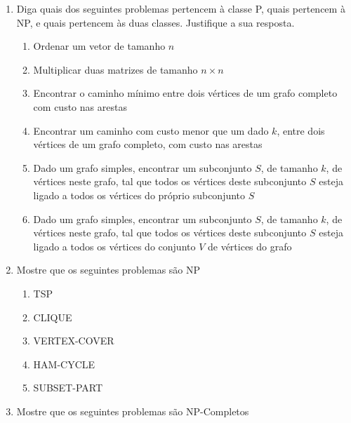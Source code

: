 \documentclass[12pt]{article}
\begin{document}
\begin{enumerate}

\item Diga quais dos seguintes problemas pertencem à classe P, quais pertencem à NP, e quais pertencem às duas classes. Justifique a sua resposta.

\begin{enumerate}

\item Ordenar um vetor de tamanho $n$

\item Multiplicar duas matrizes de tamanho $n\times n$

\item Encontrar o caminho mínimo entre dois vértices de um grafo completo com custo nas arestas

\item Encontrar um caminho com custo menor que um dado $k$, entre dois vértices de um grafo completo, com custo nas arestas

\item Dado um grafo simples, encontrar um subconjunto $S$, de tamanho $k$, de vértices neste grafo, tal que todos os vértices deste subconjunto $S$ esteja ligado a todos os vértices do próprio subconjunto $S$

\item Dado um grafo simples, encontrar um subconjunto $S$, de tamanho $k$, de vértices neste grafo, tal que todos os vértices deste subconjunto $S$ esteja ligado a todos os vértices do conjunto $V$ de vértices do grafo

\end{enumerate}


\item Mostre que os seguintes problemas são NP

\begin{enumerate}

\item TSP

\item CLIQUE

\item VERTEX-COVER

\item HAM-CYCLE

\item SUBSET-PART

\end{enumerate}

\item Mostre que os seguintes problemas são NP-Completos


\end{enumerate}
\end{document}
